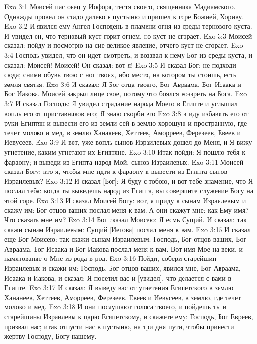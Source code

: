 Exo 3:1  Моисей пас овец у Иофора, тестя своего, священника Мадиамского. Однажды провел он стадо далеко в пустыню и пришел к горе Божией, Хориву.
Exo 3:2  И явился ему Ангел Господень в пламени огня из среды тернового куста. И увидел он, что терновый куст горит огнем, но куст не сгорает.
Exo 3:3  Моисей сказал: пойду и посмотрю на сие великое явление, отчего куст не сгорает.
Exo 3:4  Господь увидел, что он идет смотреть, и воззвал к нему Бог из среды куста, и сказал: Моисей! Моисей! Он сказал: вот я!
Exo 3:5  И сказал Бог: не подходи сюда; сними обувь твою с ног твоих, ибо место, на котором ты стоишь, есть земля святая.
Exo 3:6  И сказал: Я Бог отца твоего, Бог Авраама, Бог Исаака и Бог Иакова. Моисей закрыл лице свое, потому что боялся воззреть на Бога.
Exo 3:7  И сказал Господь: Я увидел страдание народа Моего в Египте и услышал вопль его от приставников его; Я знаю скорби его
Exo 3:8  и иду избавить его от руки Египтян и вывести его из земли сей в землю хорошую и пространную, где течет молоко и мед, в землю Хананеев, Хеттеев, Аморреев, Ферезеев, Евеев и Иевусеев.
Exo 3:9  И вот, уже вопль сынов Израилевых дошел до Меня, и Я вижу угнетение, каким угнетают их Египтяне.
Exo 3:10  Итак пойди: Я пошлю тебя к фараону; и выведи из Египта народ Мой, сынов Израилевых.
Exo 3:11  Моисей сказал Богу: кто я, чтобы мне идти к фараону и вывести из Египта сынов Израилевых?
Exo 3:12  И сказал [Бог]: Я буду с тобою, и вот тебе знамение, что Я послал тебя: когда ты выведешь народ из Египта, вы совершите служение Богу на этой горе.
Exo 3:13  И сказал Моисей Богу: вот, я приду к сынам Израилевым и скажу им: Бог отцов ваших послал меня к вам. А они скажут мне: как Ему имя? Что сказать мне им?
Exo 3:14  Бог сказал Моисею: Я есмь Сущий. И сказал: так скажи сынам Израилевым: Сущий [Иегова] послал меня к вам.
Exo 3:15  И сказал еще Бог Моисею: так скажи сынам Израилевым: Господь, Бог отцов ваших, Бог Авраама, Бог Исаака и Бог Иакова послал меня к вам. Вот имя Мое на веки, и памятование о Мне из рода в род.
Exo 3:16  Пойди, собери старейшин Израилевых и скажи им: Господь, Бог отцов ваших, явился мне, Бог Авраама, Исаака и Иакова, и сказал: Я посетил вас и [увидел], что делается с вами в Египте.
Exo 3:17  И сказал: Я выведу вас от угнетения Египетского в землю Хананеев, Хеттеев, Аморреев, Ферезеев, Евеев и Иевусеев, в землю, где течет молоко и мед.
Exo 3:18  И они послушают голоса твоего, и пойдешь ты и старейшины Израилевы к царю Египетскому, и скажете ему: Господь, Бог Евреев, призвал нас; итак отпусти нас в пустыню, на три дня пути, чтобы принести жертву Господу, Богу нашему.
